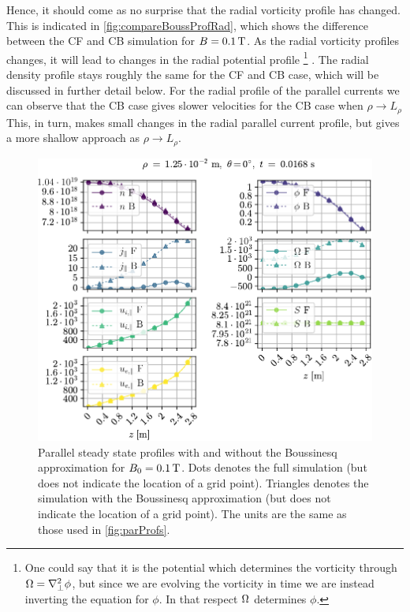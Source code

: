 Hence, it should come as no surprise that the radial vorticity profile has changed.
This is indicated in \cref{fig:compareBoussProfRad}, which shows the difference between the CF and CB simulation for $B=0.1\, \text{T}$.
As the radial vorticity profiles changes, it will lead to changes in the radial potential profile%
%
\footnote{One could say that it is the potential which determines the vorticity through $\Omega = \nabla_\perp^2 \phi$, but since we are evolving the vorticity in time we are instead inverting the equation for $\phi$.
In that respect $\Omega$ determines $\phi$.}%
%
.
The radial density profile stays roughly the same for the CF and CB case, which will be discussed in further detail below.
For the radial profile of the parallel currents we can observe that the CB case gives slower velocities for the CB case when $\rho \to L_\rho$
This, in turn, makes small changes in the radial parallel current profile, but gives a more shallow approach as $\rho\to L_\rho$.
%
\begin{figure}[h]
    \centering
    \includegraphics{fig/results/compareBouss/1DProfPar001B}
    \caption{Parallel steady state profiles with and without the Boussinesq approximation for $B_0=0.1\, \text{T}$.
        Dots denotes the full simulation (but does not indicate the location of a grid point).
        Triangles denotes the simulation with the Boussinesq approximation (but does not indicate the location of a grid point).
        The units are the same as those used in \cref{fig:parProfs}.
    }
    \label{fig:compareBoussProfPar}
\end{figure}
%

